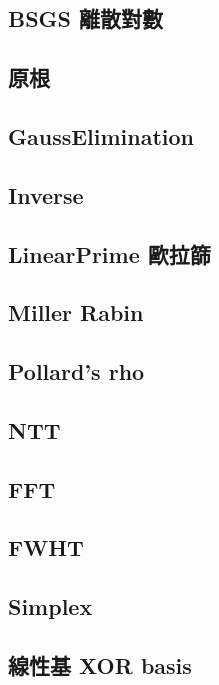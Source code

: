\subsection{BSGS 離散對數}

\subsection{原根}

\subsection{GaussElimination}

\subsection{Inverse}

\subsection{LinearPrime 歐拉篩}

\subsection{Miller Rabin}

\subsection{Pollard's rho}

\subsection{NTT}

\subsection{FFT}

\subsection{FWHT}

\subsection{Simplex}

\subsection{線性基 XOR basis}

